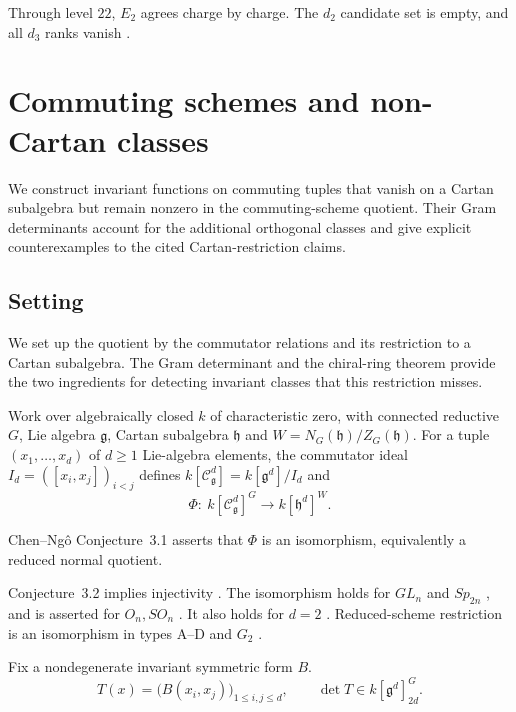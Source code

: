 \documentclass[11pt]{article}
\numberwithin{equation}{section}
\numberwithin{figure}{section}
\numberwithin{table}{section}
\begin{document}
Through level $22$, $E_2$ agrees charge by charge. The $d_2$ candidate set is empty, and all $d_3$ ranks vanish \cite{ChangChevalley}.

\section{Commuting schemes and non-Cartan classes}\label{sec-E-gram}

We construct invariant functions on commuting tuples that vanish on a Cartan subalgebra but remain nonzero in the commuting-scheme quotient. Their Gram determinants account for the additional orthogonal classes and give explicit counterexamples to the cited Cartan-restriction claims.

\subsection{Setting}\label{sec-E-gram-setting}

We set up the quotient by the commutator relations and its restriction to a Cartan subalgebra. The Gram determinant and the chiral-ring theorem provide the two ingredients for detecting invariant classes that this restriction misses.

Work over algebraically closed $k$ of characteristic zero, with connected reductive $G$, Lie algebra $\mathfrak g$, Cartan subalgebra $\mathfrak h$ and $W=N_G(\mathfrak h)/Z_G(\mathfrak h)$. For a tuple $(x_1,\ldots,x_d)$ of $d\ge1$ Lie-algebra elements, the commutator ideal $I_d=([x_i,x_j])_{i<j}$ defines $k[\mathcal C^d_{\mathfrak g}]=k[\mathfrak g^d]/I_d$ and
\begin{equation}\label{eq-E-Phi}
\Phi:\ k[\mathcal C^d_{\mathfrak g}]^G\longrightarrow k[\mathfrak h^d]^W.
\end{equation}

Chen--Ng\^o Conjecture~3.1 asserts that $\Phi$ is an isomorphism, equivalently a reduced normal quotient.

Conjecture~3.2 implies injectivity \cite[Section 3]{ChenNgo}. The isomorphism holds for $GL_n$ \cite[Theorem 3.3]{Vaccarino,Domokos,ChenNgo} and $Sp_{2n}$ \cite[Theorem 4.1]{ChenNgoSp}, and is asserted for $O_n,SO_n$ \cite[Theorem 1.2]{SXX}. It also holds for $d=2$ \cite[Theorem 1.4.11, 47, 48]{LNY}. Reduced-scheme restriction is an isomorphism in types A--D and $G_2$ \cite{Hunziker,Richardson}.

Fix a nondegenerate invariant symmetric form $B$.
\begin{equation}\label{eq-E-gram}
T(x)=\bigl(B(x_i,x_j)\bigr)_{1\le i,j\le d},\qquad \det T\in k[\mathfrak g^d]^G_{2d}.
\end{equation}
\end{document}
